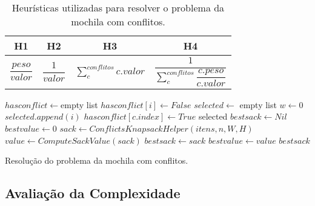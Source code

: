 \documentclass[a4paper, 11pt]{article}
\begin{document}
\begin{table}[htb]
\centering
\renewcommand{\arraystretch}{2}
\begin{tabular}{c|c|c|c}
H1 & H2 & H3 & H4 \\\hline
$\dfrac{peso}{valor}$ &
$\dfrac{1}{valor}$ &
$\sum^{conflitos}_{c} c.valor$ &
$\dfrac{1}{\sum^{conflitos}_{c}\dfrac{c.peso}{c.valor}}$ \\
\end{tabular}
\caption{Heurísticas utilizadas para resolver o problema da mochila com conflitos.}
\label{tab:q3:heuristics}
\end{table}

\begin{algorithm}[htb]
\begin{algorithmic}[1]
  \State {}
     \label{alg:q3:heuristics:start}
    \EndFor \label{alg:q3:heuristics:end}
     \label{alg:q3:sort}
    \State $hasconflict \gets $empty list \label{alg:q3:init:start}
      \State $hasconflict[i] \gets False$
    \EndFor
    \State $selected \gets $ empty list
    \State $w \gets 0$ \label{alg:q3:init:end}
     \label{alg:q3:select:start}
        \State $selected.append(i)$
          \State $hasconflict[c.index] \gets True$
        \EndFor
      \EndIf
    \EndFor \label{alg:q3:select:end}
    \State \Return selected
  \EndFunction
  \State {}
    \State $bestsack \gets Nil$
    \State $bestvalue \gets 0$
      \State $sack \gets ConflictsKnapsackHelper(itens, n, W, H)$
      \State $value \gets ComputeSackValue(sack)$ \label{alg:q3:sackval}
        \State $bestsack \gets sack$
        \State $bestvalue \gets value$
      \EndIf
    \EndFor
    \State \Return $bestsack$
  \EndFunction
\end{algorithmic}
\caption{Resolução do problema da mochila com conflitos.}
\label{alg:q3}
\end{algorithm}

\subsection{Avaliação da Complexidade}
\end{document}
